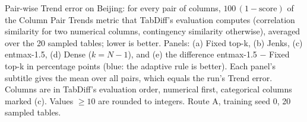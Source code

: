 Pair-wise Trend error on Beijing: for every pair of columns, $100\,(1-\text{score})$ of the Column Pair Trends metric that TabDiff's evaluation computes (correlation similarity for two numerical columns, contingency similarity otherwise), averaged over the 20 sampled tables; lower is better. Panels: (a) Fixed top-k, (b) Jenks, (c) entmax-1.5, (d) Dense ($k = N-1$), and (e) the difference entmax-1.5 $-$ Fixed top-k in percentage points (blue: the adaptive rule is better). Each panel's subtitle gives the mean over all pairs, which equals the run's Trend error. Columns are in TabDiff's evaluation order, numerical first, categorical columns marked (c). Values $\geq 10$ are rounded to integers. Route A, training seed 0, 20 sampled tables.
